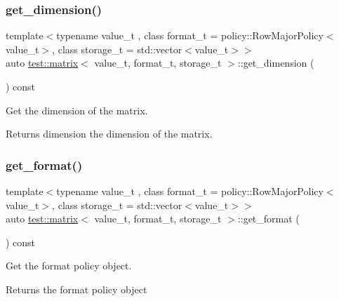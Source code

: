 \subsubsection{\texorpdfstring{get\_dimension()}{get\_dimension()}}
{\footnotesize\ttfamily template$<$typename value\+\_\+t , class format\+\_\+t  = policy\+::\+Row\+Major\+Policy$<$value\+\_\+t$>$, class storage\+\_\+t  = std\+::vector$<$value\+\_\+t$>$$>$ \\
auto \mbox{\hyperlink{classtest_1_1matrix}{test\+::matrix}}$<$ value\+\_\+t, format\+\_\+t, storage\+\_\+t $>$\+::get\+\_\+dimension (\begin{DoxyParamCaption}{ }\end{DoxyParamCaption}) const\hspace{0.3cm}{\ttfamily [inline]}}



Get the dimension of the matrix. 

\begin{DoxyReturn}{Returns}
dimension the dimension of the matrix. 
\end{DoxyReturn}
\mbox{\label{classtest_1_1matrix_a8ae828048f36dc401ec79755c782a204}} 
\subsubsection{\texorpdfstring{get\_format()}{get\_format()}}
{\footnotesize\ttfamily template$<$typename value\+\_\+t , class format\+\_\+t  = policy\+::\+Row\+Major\+Policy$<$value\+\_\+t$>$, class storage\+\_\+t  = std\+::vector$<$value\+\_\+t$>$$>$ \\
auto \mbox{\hyperlink{classtest_1_1matrix}{test\+::matrix}}$<$ value\+\_\+t, format\+\_\+t, storage\+\_\+t $>$\+::get\+\_\+format (\begin{DoxyParamCaption}{ }\end{DoxyParamCaption}) const\hspace{0.3cm}{\ttfamily [inline]}}



Get the format policy object. 

\begin{DoxyReturn}{Returns}
the format policy object 
\end{DoxyReturn}
\mbox{\label{classtest_1_1matrix_a693b7a5396ba6a51342a525cb6738be1}} 
